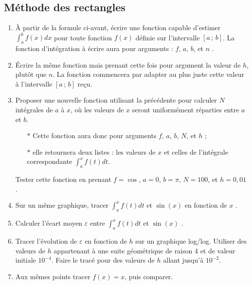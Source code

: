 \subsection{Méthode des rectangles}
\begin{enumerate}
\item À  partir de  la formule ci-avant,  écrire une  fonction capable
  d'estimer $\int_a^b  f(x)dx$ pour toute fonction  $f(x)$ définie sur
  l'intervalle $[a\,;\,b]$.  La fonction  d'intégration
  à   écrire  aura   pour  arguments   :   $f$,  $a$,   $b$,  et   $n$
  .
\item Écrire la même fonction mais prenant cette fois pour argument la
  valeur de  $h$, plutôt que $n$.  La  fonction commencera par  adapter au  plus juste
  cette valeur à l'intervalle $[a\,;\,b]$ reçu.
\item Proposer  une nouvelle  fonction utilisant la précédente
  pour calculer  $N$ intégrales de  $a$ à $x$,  où les valeurs  de $x$
  seront  uniformément  réparties  entre  $a$ et  $b$.
  \begin{itemize}
  \item[$\ast$] Cette fonction aura donc  pour arguments $f$, $a$, $b$,
    $N$, et $h$ ;
  \item[$\ast$] elle retournera deux listes :  les valeurs   de  $x$   et
    celles  de   l'intégrale  correspondante $\int_a^xf(t)dt$.
  \end{itemize}
  Tester cette fonction en prenant $f=\cos$, $a=0$, $b=\pi$, $N=100$, et
  $h=0,01$
  .\\
\item  Sur un même graphique, tracer $\int_a^xf(t)dt$ et $\sin(x)$ en fonction de $x$
  .
\item  Calculer  l'écart  moyen $\varepsilon$ entre  $\int_a^xf(t)dt$  et  $\sin(x)$
  .
\item  Tracer l'évolution  de  $\varepsilon$  en fonction  de  $h$ sur  un
  graphique   log/log. Utiliser  des valeurs  de  $h$  appartenant à  une  suite
  géométrique de  raison 4 et  de valeur initiale $10^{-4}$.  Faire le
  tracé pour des valeurs de $h$ allant jusqu'à $10^{-2}$.
\item Aux   mêmes  points   tracer  $f(x)=x$,   puis  comparer.


\end{enumerate}

